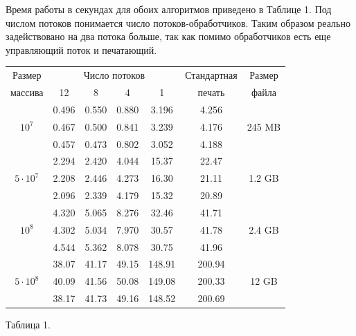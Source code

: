 Время работы в секундах для обоих алгоритмов приведено в Таблице 1.
Под числом потоков понимается число потоков-обработчиков. 
Таким образом реально задействовано на два потока больше, так как помимо обработчиков есть еще управляющий поток и печатающий.
\begin{center}
\begin{longtable}{||c|c|c|c|c|c|c||}
\hline
\hline
Размер & \multicolumn{4}{c|}{Число потоков} & Стандартная & Размер\\
\hhline{~|-|-|-|-|~|~|}
массива & 12 & 8 & 4 & 1 & печать &файла\\
\hline
\hline
 & 0.496 & 0.550 & 0.880 & 3.196 & 4.256 & \\
\hhline{~|-|-|-|-|-|~|}
$10^7$   & 0.467 & 0.500 & 0.841 & 3.239 & 4.176 & 245 MB \\
\hhline{~|-|-|-|-|-|~|}
 & 0.457 & 0.473 & 0.802 & 3.052 & 4.188 &\\
\hline
&2.294 & 2.420 & 4.044 & 15.37 & 22.47 & \\
\hhline{~|-|-|-|-|-|~|}
$5 \cdot 10^7$  & 2.208 & 2.446 & 4.273 & 16.30 & 21.11 &  1.2 GB\\
\hhline{~|-|-|-|-|-|~|}
 & 2.096 & 2.339 & 4.179 & 15.32 & 20.89 & \\
\hline
 & 4.320 & 5.065 & 8.276 & 32.46 & 41.71 & \\
\hhline{~|-|-|-|-|-|~|}
$10^8$  & 4.302 & 5.034 & 7.970 & 30.57 & 41.78 & 2.4 GB\\
\hhline{~|-|-|-|-|-|~|}
& 4.544 & 5.362& 8.078 & 30.75 & 41.96 & \\
\hline
 & 38.07 & 41.17 & 49.15 & 148.91 & 200.94 & \\
\hhline{~|-|-|-|-|-|~|}
$5 \cdot 10^8$ & 40.09 & 41.56 & 50.08 & 149.08 & 200.33 & 12 GB\\
\hhline{~|-|-|-|-|-|~|}
 & 38.17& 41.73& 49.16 & 148.52 & 200.69 & \\
\hline
\hline
\end{longtable}
\small{Таблица 1.}
\end{center}

